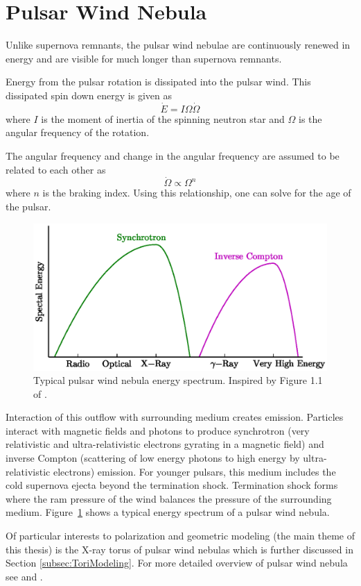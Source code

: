 \section{Pulsar Wind Nebula}
\label{sec:PWN}

Unlike supernova remnants,
the pulsar wind nebulae are continuously renewed in energy
and are visible for much longer than supernova remnants.

Energy from the pulsar rotation is dissipated into the pulsar wind.
This dissipated spin down energy is given as
\begin{equation}
\dot{E}=I \Omega \dot{\Omega}
\end{equation}
where $I$ is the moment of inertia of the spinning neutron star and $\Omega$
is the angular frequency of the rotation.

The angular frequency and change in the angular frequency are
assumed to be related to each other as
\begin{equation}\label{eq:angFreq}\dot{\Omega} \propto \Omega^n\end{equation}
where $n$ is the braking index.
Using this relationship, one can solve for the age of the pulsar.

\begin{figure}[t!!]
\includegraphics[width=.95\textwidth]{chapters/pulsarAnatomy/figures/spec.eps}
\caption[Typical pulsar wind nebula energy spectrum]{
\label{spec} Typical pulsar wind nebula energy spectrum.
Inspired by Figure 1.1 of \cite{vanEttenPhd2012}.}
\end{figure}

Interaction of this outflow with surrounding medium creates emission.
Particles interact with magnetic fields and photons to produce
synchrotron (very relativistic and ultra-relativistic electrons
gyrating in a magnetic field)
and inverse Compton (scattering of low energy photons
to high energy by ultra-relativistic electrons) emission. For
younger pulsars, this medium includes the cold supernova ejecta
beyond the termination shock.
Termination shock forms where the ram pressure of the wind 
balances the pressure of the surrounding medium.  
Figure~\ref{spec} shows a typical energy spectrum of a pulsar
wind nebula.


Of particular interests to polarization and geometric modeling
(the main theme of this thesis)
is the X-ray torus of pulsar wind nebulas which is further discussed
in Section \ref{subsec:ToriModeling}.
For more detailed overview of pulsar wind nebula see \cite{vanEttenPhd2012}
and
\cite{gaensler2006evolution}.
